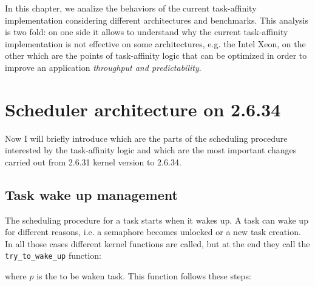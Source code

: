 In this chapter, we analize the behaviors of the current task-affinity
implementation considering different architectures and benchmarks.  This
analysis is two fold: on one side it allows to understand why the current
task-affinity implementation is not effective on some architectures, e.g. the
Intel Xeon, on the other which are the points of task-affinity logic that can be
optimized in order to improve an application \emph{throughput and
predictability}.

\section{Scheduler architecture on 2.6.34}

Now I will briefly introduce which are the parts of the scheduling procedure 
interested by the task-affinity logic and which are the most important changes 
carried out from 2.6.31 kernel version to 2.6.34.

\subsection{Task wake up management}

The scheduling procedure for a task starts when it wakes up. A task can wake up
for different reasons, i.e. a semaphore becomes unlocked or a new task creation.  In all those cases different
kernel functions are called, but at the end they call the \texttt{try\_to\_wake\_up} function:

\lstset{basicstyle=\footnotesize, language=c, captionpos=b, frame=single, label=lis:API_ttwu}


where $p$ is the to be waken task.
This function follows these steps:

